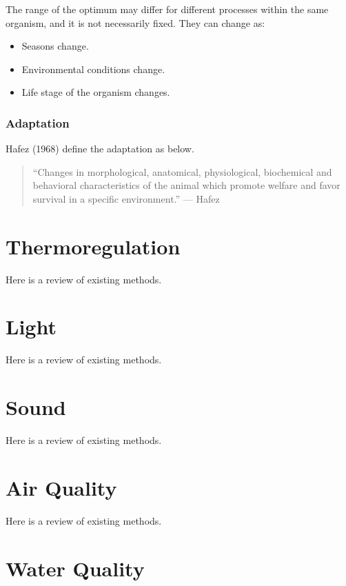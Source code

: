 \documentclass[]{book}
\providecommand{\tightlist}{%
  \setlength{\itemsep}{0pt}\setlength{\parskip}{0pt}}
\begin{document}
The range of the optimum may differ for different processes within the
same organism, and it is not necessarily fixed. They can change as:

\begin{itemize}
\tightlist
\item
  Seasons change.
\item
  Environmental conditions change.
\item
  Life stage of the organism changes.
\end{itemize}

\subsection{Adaptation}\label{adaptation}

Hafez (1968) define the adaptation as below.

\begin{quote}
``Changes in morphological, anatomical, physiological, biochemical and
behavioral characteristics of the animal which promote welfare and favor
survival in a specific environment.'' --- Hafez
\end{quote}

\chapter{Thermoregulation}\label{thermoregulation}

Here is a review of existing methods.

\chapter{Light}\label{light}

Here is a review of existing methods.

\chapter{Sound}\label{sound}

Here is a review of existing methods.

\chapter{Air Quality}\label{air-quality}

Here is a review of existing methods.

\chapter{Water Quality}\label{water-quality}
\end{document}
